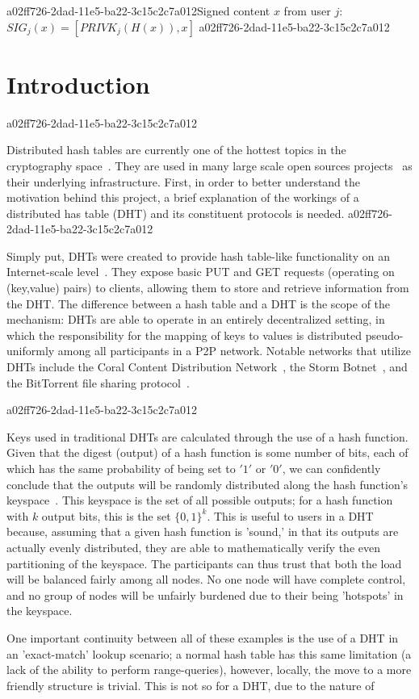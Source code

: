 \documentclass[12pt]{article}
\begin{document}
a02ff726-2dad-11e5-ba22-3c15c2c7a012Signed content $x$ from user $j$: $SIG_j(x) = \left[ PRIVK_j( H(x) ), x \right]$
a02ff726-2dad-11e5-ba22-3c15c2c7a012
\section{Introduction}
a02ff726-2dad-11e5-ba22-3c15c2c7a012\par Distributed hash tables are currently one of the hottest topics in the cryptography space~\cite{Stoica:2001dj,Rowstron:2001ea,Ratnasamy:2001wn}. They are used in many large scale open sources projects~\cite{Freitas:2013tb,Xu:2010vs,Perfitt:2010fh} as their underlying infrastructure. First, in order to better understand the motivation behind this project, a brief explanation of the workings of a distributed has table (DHT) and its constituent protocols is needed.
a02ff726-2dad-11e5-ba22-3c15c2c7a012
\par Simply put, DHTs were created to provide hash table-like functionality on an Internet-scale level~\cite{Ratnasamy:2001wn}. They expose basic PUT and GET requests (operating on (key,value) pairs) to clients, allowing them to store and retrieve information from the DHT. The difference between a hash table and a DHT is the scope of the mechanism: DHTs are able to operate in an entirely decentralized setting, in which the responsibility for the mapping of keys to values is distributed pseudo-uniformly among all participants in a P2P network. Notable networks that utilize DHTs include the Coral Content Distribution Network~\cite{Freedman:2004vb}, the Storm Botnet~\cite{Holz:2008uk}, and the BitTorrent file sharing protocol~\cite{Cohen:y1_8mBnw}.

a02ff726-2dad-11e5-ba22-3c15c2c7a012\par Keys used in traditional DHTs are calculated through the use of a hash function. Given that the digest (output) of a hash function is some number of bits, each of which has the same probability of being set to $'1'$ or $'0'$, we can confidently conclude that the outputs will be randomly distributed along the hash function's keyspace~. This keyspace is the set of all possible outputs; for a hash function with $k$ output bits, this is the set $\{0,1\}^k$. This is useful to users in a DHT because, assuming that a given hash function is 'sound,' in that its outputs are actually evenly distributed, they are able to mathematically verify the even partitioning of the keyspace. The participants can thus trust that both the load will be balanced fairly among all nodes. No one node will have complete control, and no group of nodes will be unfairly burdened due to their being 'hotspots' in the keyspace.~

\par One important continuity between all of these examples is the use of a DHT in an 'exact-match' lookup scenario; a normal hash table has this same limitation (a lack of the ability to perform range-queries), however, locally, the move to a more friendly structure is trivial. This is not so for a DHT, due to the nature of
\printbibliography
\end{document}
